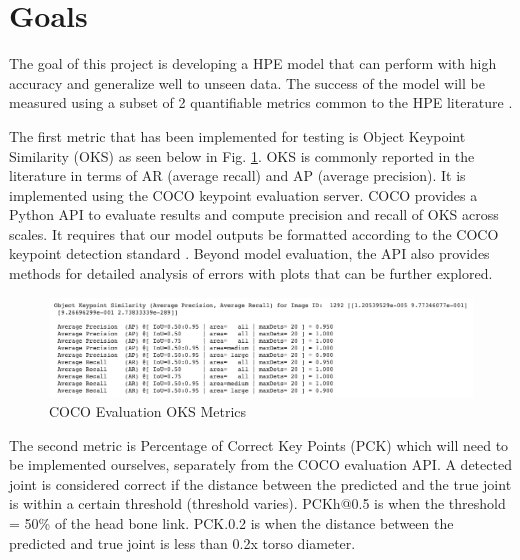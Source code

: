 \documentclass[11pt, letterpaper]{article}
\begin{document}
\section{Goals}
\label{SectionGoals}

The goal of this project is developing a HPE model that can perform with high accuracy and generalize well to unseen data. The success of the model will be measured using a subset of 2 quantifiable metrics common to the HPE literature \cite{Babu_2019}. 

The first metric that has been implemented for testing is Object Keypoint Similarity (OKS) as seen below in Fig. \ref{fig:oks_evaluation_metrics}. OKS is commonly reported in the literature in terms of AR (average recall) and AP (average precision). It is implemented using the COCO keypoint evaluation server. COCO provides a Python API \cite{coco_keypoints} to evaluate results and compute precision and recall of OKS across scales. It requires that our model outputs be formatted according to the COCO keypoint detection standard \cite{coco_format_results}. Beyond model evaluation, the API also provides methods for detailed analysis of errors with plots that can be further explored.

\begin{figure}
    \centering
    \includegraphics[width=1\textwidth]{oks_evaluation_metrics.png}
    \caption{COCO Evaluation OKS Metrics}
    \label{fig:oks_evaluation_metrics}
\end{figure}

The second metric is Percentage of Correct Key Points (PCK) \cite{Cbsudux_2019} which will need to be implemented ourselves, separately from the COCO evaluation API. A detected joint is considered correct if the distance between the predicted and the true joint is within a certain threshold (threshold varies). PCKh@0.5 is when the threshold = 50\% of the head bone link. PCK.0.2 is when the distance between the predicted and true joint is less than 0.2x torso diameter.
\end{document}
